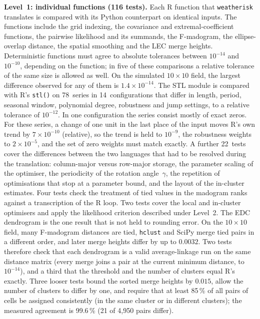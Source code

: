 \documentclass[preprint,12pt,a4paper]{elsarticle}
\begin{document}
{\textbf{Level~1: individual functions (116 tests).}
Each R function that \texttt{weatherisk} translates is compared with
its Python counterpart on identical inputs. The functions include the
grid indexing, the covariance and extremal-coefficient functions, the
pairwise likelihood and its summands, the F-madogram, the
ellipse-overlap distance, the spatial smoothing and the LEC merge
heights. Deterministic functions must agree to absolute tolerances
between $10^{-14}$ and $10^{-10}$, depending on the function; in five
of these comparisons a relative tolerance of the same size is
allowed as well. On the simulated $10{\times}10$ field, the largest
difference observed for any of them is $1.4\times10^{-14}$. The STL module is compared with
R's \texttt{stl()} on 78~series in 14~configurations that differ in
length, period, seasonal window, polynomial degree, robustness and
jump settings, to a relative tolerance of $10^{-12}$. In one
configuration the series consist mostly of exact zeros. For these
series, a change of one unit in the
last place of the input moves R's own trend by $7\times10^{-10}$
(relative), so the trend is held to $10^{-9}$, the robustness weights
to $2\times10^{-5}$, and the set of zero weights must match exactly.
A further 22~tests cover the differences between the two languages
that had to be resolved during the translation: column-major versus
row-major storage, the parameter scaling of the optimiser, the
periodicity of the rotation angle~$\gamma$, the repetition of
optimisations that stop at a parameter bound, and the layout of the
in-cluster estimates. Four
tests check the treatment of tied values in the madogram ranks
against a transcription of the R loop. Two tests cover the local and
in-cluster optimisers and apply the likelihood criterion described
under Level~2. The EDC dendrogram is the one result that is not
held to rounding error. On the $10{\times}10$ field, many F-madogram
distances are tied, \texttt{hclust} and SciPy merge tied pairs in a
different order, and later merge heights differ by up to $0.0032$.
Two tests therefore check that each dendrogram is a valid
average-linkage run on the same distance matrix (every merge joins a
pair at the current minimum distance, to $10^{-14}$), and a third
that the threshold and the number of clusters equal R's exactly. Three looser
tests bound the sorted merge heights by $0.015$, allow the number of
clusters to differ by one, and require that at least 85\,\% of all
pairs of cells be assigned consistently (in the same cluster or in
different clusters); the measured agreement is 99.6\,\% (21 of
4{,}950 pairs differ).

}
\end{document}
